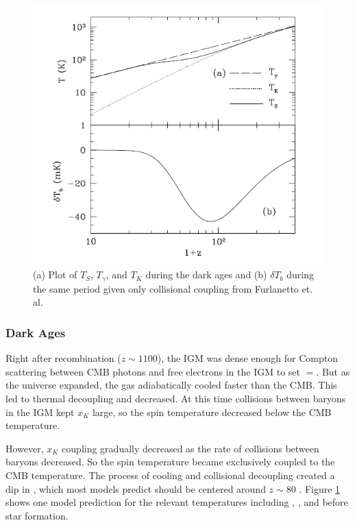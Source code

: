 \begin{figure}[htb]
\begin{center}
\includegraphics[width=0.95\linewidth]{Introduction/figures/dark_ages_global_spectrum.jpg}
\caption{(a) Plot of $T_S$, $T_\gamma$, and $T_K$ during the dark ages and (b) $\delta T_b$ during the same period given only collisional coupling from Furlanetto et. al. \cite{furlanetto_2006}}
\label{Fig:da_global}
\end{center}
\end{figure}

\subsubsection{Dark Ages}

Right after recombination ($z \sim 1100$), the IGM was dense enough for Compton scattering between CMB photons and free electrons in the IGM to set \tk$=$\tg. But as the universe expanded, the gas adiabatically cooled faster than the CMB. This led to thermal decoupling and \tk decreased. At this time collisions between baryons in the IGM kept $x_K$ large, so the spin temperature decreased below the CMB temperature. 

However, $x_K$ coupling gradually decreased as the rate of collisions between baryons decreased. So the spin temperature became exclusively coupled to the CMB temperature. The process of cooling and collisional decoupling created a dip in \ts, which most models predict should be centered around $z \sim 80 $ \cite{furlanetto_2006}. Figure \ref{Fig:da_global} shows one model prediction for the relevant temperatures including \tg, \tk, \ts and \dtb before star formation. 

